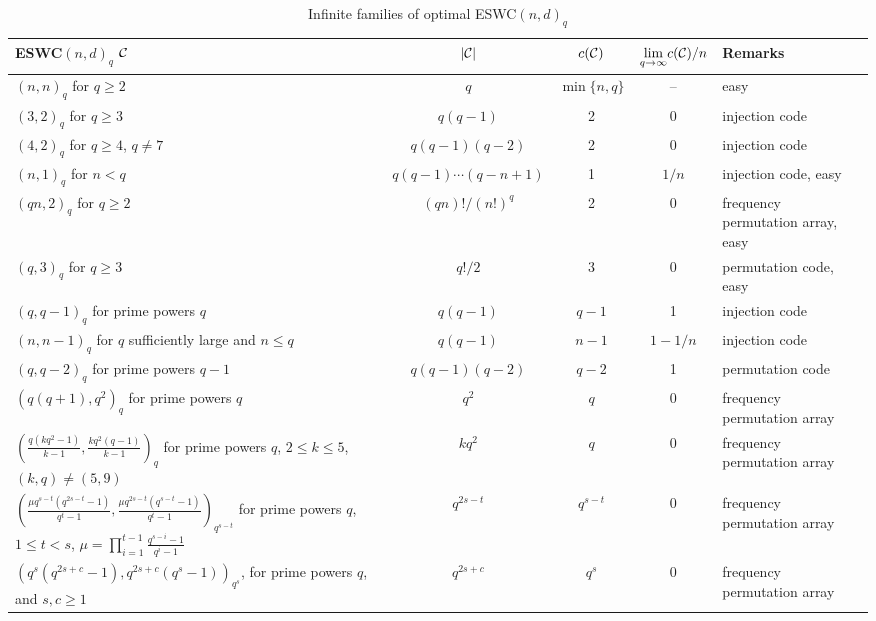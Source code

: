 \documentclass[draft, 11pt]{article}
\begin{document}
\begin{landscape}
\begin{table}
\renewcommand{\arraystretch}{1.1}
\centering
\small
\caption{Infinite families of optimal ESWC$(n,d)_q$}
\label{table:optimal}
\begin{tabular}{p{8cm}cccp{37mm}}\hline
ESWC$(n,d)_q$ $\mathcal C$ & $|\mathcal C|$ & $c(\mathcal C)$ & $\underset{q\to \infty}{\lim} c(\mathcal C)/n$ & Remarks\\ \hline\hline
$(n,n)_q$ for $q\ge 2$ & $q$ & $\min\{n,q\}$ & --
& easy \\ \hline
$(3,2)_q$  for $q\geq 3$  & $q(q-1)$ & 2 & 0 & injection code \cite{Dukes:2012}\\

$(4,2)_q$ for $q\geq 4$, $q\not=7$ & $q(q-1)(q-2)$ & 2 & 0 & injection code \cite{Dukes:2012} \\

$(n,1)_q$ for $n< q$     & $q(q-1)\cdots(q-n+1)$ & 1 & $1/n$ & injection code, easy\\
$(qn,2)_q$ for $q\geq 2$     & $(qn)!/(n!)^q$  & 2 & 0 &  frequency permutation array, easy\\
$(q,3)_q$ for $q\geq 3$ & $q!/2$ & 3 & 0 & permutation code, easy\\
$(q,q-1)_q$ for prime powers $q$        & $q(q-1)$ & $q-1$ & 1 & injection code \cite{Colbournetal:2004}\\
$(n,n-1)_q$ for $q$ sufficiently large and $n\le q$     & $q(q-1)$ & $n-1$ & $1-1/n$ & injection code \cite{Dukes:2012}\\
$(q,q-2)_q$ for prime powers $q-1$      & $q(q-1)(q-2)$ & $q-2$ & 1&  permutation code \cite{FranklDeza:1977}\\ \hline

$\left(q(q+1),q^2\right)_q$ for  prime powers $q$ & $q^2$ & $q$ & 0 & frequency permutation array \cite{DingYin:2005b} \\

$\left(\frac{q(kq^2-1)}{k-1},\frac{kq^2(q-1)}{k-1}\right)_q$ for prime powers $q$, $2\leq k\leq 5$, $(k,q)\not=(5,9)$
& $kq^2$  & $q$ & 0 & frequency permutation array\cite{DingYin:2006}\\
$\left(\frac{\mu q^{s-t}(q^{2s-t}-1)}{q^t-1}, \frac{\mu q^{2s-t}(q^{s-t}-1)}{q^t-1}\right)_{q^{s-t}}$
for prime powers $q$,  $1\le t < s$,
$\mu=\prod_{i=1}^{t-1}\frac{q^{s-i}-1}{q^i-1}$
& $q^{2s-t}$ &  $q^{s-t}$ & 0 & frequency permutation array\cite{DingYin:2006}\\

$(q^s(q^{2s+c}-1), q^{2s+c}(q^s-1))_{q^s}$,  for prime powers
$q$, and  $s,c\ge 1$ &
$q^{2s+c}$ & $q^s$ & $0$ & frequency permutation array\cite{DingYin:2006}\\


\end{tabular}
\end{table}
\end{landscape}
\end{document}
